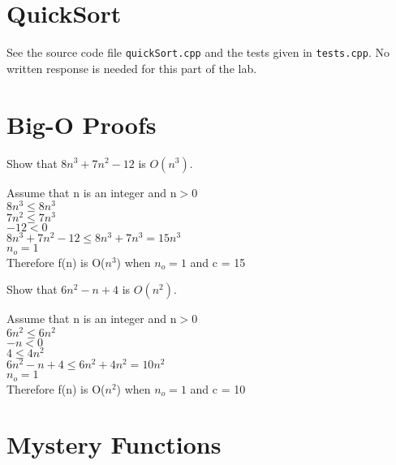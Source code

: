 \documentclass{article}
\begin{document}
    \section{QuickSort}

    See the source code file \texttt{quickSort.cpp} and the tests
    given in \texttt{tests.cpp}. No written response is needed for
    this part of the lab.

    \section{Big-O Proofs}

    \vspace{1.5mm}
     Show that $8n^3+7n^2-12$ is $O(n^3)$.

    \vspace{1.5mm}
    \noindent Assume that n is an integer and n$>0$
    \\ $8n^{3}\leqslant 8n^{3}$
    \\ $7n^{2}\leqslant 7n^{3}$
    \\ $-12<0$
    \\ $8n^3+7n^2-12 \leqslant 8n^3+7n^3 = 15n^3$
    \\ $n_{o} = 1$
    \\ Therefore f(n) is O($n^3$) when $n_{o} = 1$ and c = 15
    

    \vspace{0.5cm}
     Show that $6n^2-n+4$ is $O(n^2)$.

    \vspace{1.5mm}
    \noindent Assume that n is an integer and n$>0$
    \\ $6n^{2}\leqslant 6n^{2}$
    \\ $-n<0$
    \\ $4\leqslant 4n^{2}$
    \\ $6n^2-n+4 \leqslant 6n^2+4n^2 = 10n^2$
    \\ $n_{o} = 1$
    \\ Therefore f(n) is O($n^2$) when $n_{o} = 1$ and c = 10

    \vspace{0.5cm}
    \section{Mystery Functions}
\end{document}
